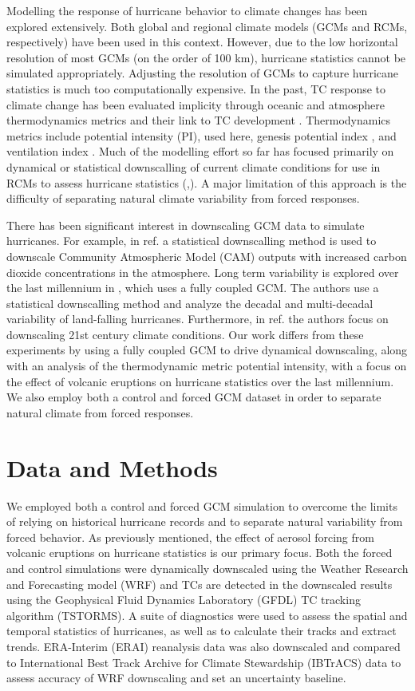 Modelling the response of hurricane behavior to climate changes has been explored extensively. Both global and regional climate models (GCMs and RCMs, respectively) have been used in this context. However, due to the low horizontal resolution of most GCMs (on the order of 100 km), hurricane statistics cannot be simulated appropriately. Adjusting the resolution of GCMs to capture hurricane statistics is much too computationally expensive. In the past, TC response to climate change has been evaluated implicity through oceanic and atmosphere thermodynamics metrics and their link to TC development \cite{wang}. Thermodynamics metrics include potential intensity (PI), used here, genesis potential index \cite{ke_nolan}, and ventilation index \cite{tang}. Much of the modelling effort so far has focused primarily on dynamical or statistical downscalling of current climate conditions for use in RCMs to assess hurricane statistics (\cite{kerry_clivar},\cite{down_method_ke}). A major limitation of this approach is the difficulty of separating natural climate variability from forced responses.
\par 
There has been significant interest in downscaling GCM  data to simulate hurricanes. For example, in ref. \cite{cam_down_ke} a statistical downscalling method \cite{down_method_ke} is used to downscale Community Atmospheric Model (CAM) outputs with increased carbon dioxide concentrations in the atmosphere. Long term variability is explored over the last millennium in \cite{lme_down_ke}, which uses a fully coupled GCM. The authors use a statistical downscalling method and analyze the decadal and multi-decadal variability of land-falling hurricanes. Furthermore, in ref. \cite{down_21st_gv} the authors focus on downscaling 21st century climate conditions. Our work differs from these experiments by using a fully coupled GCM to drive dynamical downscaling, along with an analysis of the thermodynamic metric potential intensity, with a focus on the effect of volcanic eruptions on hurricane statistics over the last millennium. We also employ both a control and forced GCM dataset in order to separate natural climate from forced responses.   

\section{Data and Methods}
\label{methods}
We employed both a control and forced GCM simulation to overcome the limits of relying on historical hurricane records and to separate natural variability from forced behavior. As previously mentioned, the effect of aerosol forcing from volcanic eruptions on hurricane statistics is our primary focus. Both the forced and control simulations were dynamically downscaled using the Weather Research and Forecasting model (WRF) \cite{wrf_tech} and TCs are detected in the downscaled results using the Geophysical Fluid Dynamics Laboratory (GFDL) TC tracking algorithm (TSTORMS). A suite of diagnostics were used to assess the spatial and temporal statistics of hurricanes, as well as to calculate their tracks and extract trends. ERA-Interim (ERAI) reanalysis data was also downscaled and compared to International Best Track Archive for Climate Stewardship (IBTrACS) data to assess accuracy of WRF downscaling and set an uncertainty baseline.
